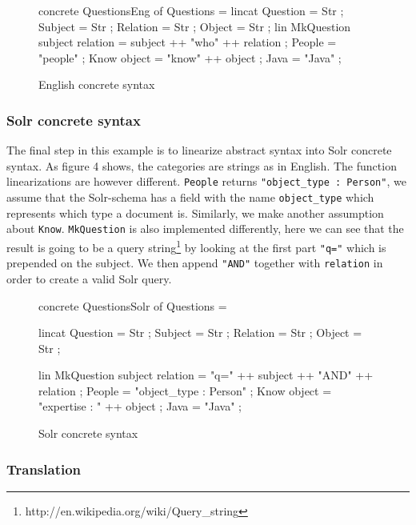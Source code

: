 \newenvironment{myfont}{\myfont}{\par}

\begin{figure}[h]
\begin{code}
concrete QuestionsEng of Questions = {
  lincat
    Question = Str ;
    Subject = Str ;
    Relation = Str ;
    Object = Str ;
  lin
    MkQuestion subject relation = subject ++ "who" ++ relation ;
    People = "people" ;
    Know object = "know" ++ object ;
    Java = "Java" ;
}
\end{code}
\caption{English concrete syntax}
\end{figure}

\subsubsection*{Solr concrete syntax}

The final step in this example is to linearize abstract syntax into Solr concrete syntax.
  As figure 4 shows, the categories are strings as in English. The function linearizations are however
  different. \texttt{People} returns 
  \texttt{"object\_type : Person"}, we assume that 
  the Solr-schema has a field with the name \texttt{object\_type} which represents 
  which type a document is. Similarly, we make another assumption about \texttt{Know}. \texttt{MkQuestion} is also implemented differently, here we can see that the result is going to be a query string\footnote{http://en.wikipedia.org/wiki/Query\_string} by looking at the first part \texttt{"q="} which is prepended on the subject. We then append \texttt{"AND"} together with \texttt{relation} in order to create a valid Solr query.

\begin{figure}[h]
\begin{code}
concrete QuestionsSolr of Questions = {
    lincat
      Question = Str ;
      Subject = Str ;
      Relation = Str ;
      Object = Str ;

    lin
      MkQuestion subject relation = "q=" ++ subject ++ "AND" ++ relation ;
      People = "object_type : Person" ;
      Know object = "expertise : " ++ object ;
      Java = "Java" ;
}
\end{code}
\caption{Solr concrete syntax}
\end{figure}

\pagebreak

\subsubsection*{Translation}


